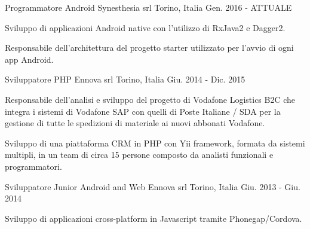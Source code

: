 


\begin{cventries}


\cventry
{Programmatore Android} %
{Synesthesia srl} %
{Torino, Italia} %
{Gen. 2016 - ATTUALE} %
{ %
	\begin{cvitems}
		\item {Sviluppo di applicazioni Android native con l'utilizzo di RxJava2 e Dagger2.}
		\item {Responsabile dell'architettura del progetto starter utilizzato per l'avvio di ogni app Android.}
	\end{cvitems}
}


\cventry
{Sviluppatore PHP} %
{Ennova srl} %
{Torino, Italia} %
{Giu. 2014 - Dic. 2015} %
{ %
	\begin{cvitems}
		\item {Responsabile dell'analisi e sviluppo del progetto di Vodafone Logistics B2C che integra i sistemi di Vodafone SAP con quelli di Poste Italiane / SDA per la gestione di tutte le spedizioni di materiale ai nuovi abbonati Vodafone. }
		\item {Sviluppo di una piattaforma CRM in PHP con Yii framework, formata da sistemi multipli, in un team di circa 15 persone composto da analisti funzionali e programmatori. }
	\end{cvitems}
}


\cventry
{Sviluppatore Junior Android and Web} %
{Ennova srl} %
{Torino, Italia} %
{Giu. 2013 - Giu. 2014} %
{ %
	\begin{cvitems}
		\item {Sviluppo di applicazioni cross-platform in Javascript tramite Phonegap/Cordova.}
	\end{cvitems}
}


\end{cventries}